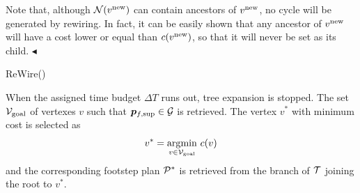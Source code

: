 Note that, although ${\cal N} (v^{\rm new})$ can contain ancestors of
$v^{\rm new}$, no cycle will be generated by rewiring.
In fact, it can be easily shown that any ancestor of $v^{\rm new}$ will have a
cost lower or equal than $c(v^{\rm new})$, so that it will never be set as
its child.
\hfill $\blacktriangleleft$

\begin{procedure}%
	\small
	\removelatexerror
    \caption{ReWire()}
	\label{proc:rewire}

	\vspace{2pt}
    \BlankLine
			
		
	\Return\;	

\end{procedure}

\smallskip

When the assigned time budget ${\Delta T}$ runs out, tree expansion is stopped.
The set ${\cal V}_{\rm goal}$ of vertexes $v$ such that
${\bm{p}}_{f,{\rm sup}} \in {\cal G}$ is retrieved.
The vertex $v^*$ with minimum cost is selected as
\begin{equation}
    \label{eq:WoS:BestVertex}
    v^* = \underset{v \in {\cal V}_{\rm goal}}{\arg\!\min} \ c(v)
\end{equation}
and the corresponding footstep plan ${\cal P}^*$ is retrieved from the branch
of $\cal T$ joining the root to $v^*$.

